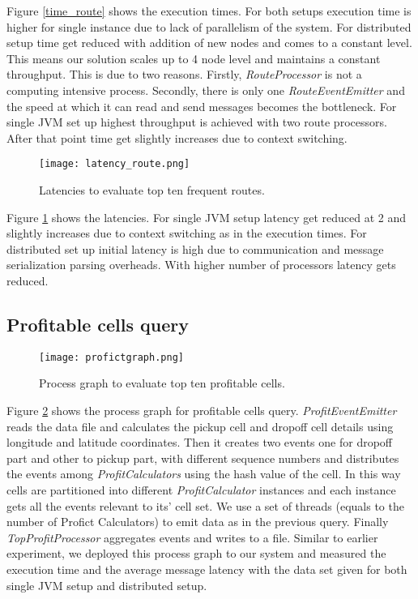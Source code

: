 Figure \ref{time_route} shows the execution times. For both setups execution time is higher for single instance due to lack of parallelism of the system. For distributed setup time get reduced with addition of new nodes and comes to a constant level. This means our solution scales up to 4 node level and maintains a constant throughput. This is due to two reasons. Firstly, \textit{RouteProcessor} is not a computing intensive process. Secondly, there is only one \textit{RouteEventEmitter} and the speed at which it can read and send messages becomes the bottleneck. For single JVM set up highest throughput is achieved with two route processors. After that point time get slightly increases due to context switching.

\begin{figure}[!t]
        \centering
        \texttt{[image: latency\_route.png]}
        \caption{Latencies to evaluate top ten frequent routes.}
        \label{latency_route}
\end{figure}


Figure \ref{latency_route} shows the latencies. For single JVM setup latency get reduced at 2 and slightly increases due to context switching as in the execution times. For distributed set up initial latency is high due to communication and message serialization parsing overheads. With higher number of processors latency gets reduced.

\subsection{Profitable cells query}

\begin{figure}[!t]
        \centering
        \texttt{[image: profictgraph.png]}
        \caption{Process graph to evaluate top ten profitable cells.}
        \label{profictgraph}
\end{figure}

Figure \ref{profictgraph} shows the process graph for profitable cells query. \textit{ProfitEventEmitter} reads the data file and calculates the pickup cell and dropoff cell details using longitude and latitude coordinates. Then it creates two events one for dropoff part and other to pickup part, with different sequence numbers and distributes the events among \textit{ProfitCalculators} using the hash value of the cell. In this way cells are partitioned into different \textit{ProfitCalculator} instances and each instance gets all the events relevant to its' cell set. We use a set of threads (equals to the number of Profict Calculators) to emit data as in the previous query. Finally \textit{TopProfitProcessor} aggregates events and writes to a file. 
Similar to earlier experiment,  we deployed this process graph to our system and measured the execution time and the average message latency with the data set given for both single JVM setup and distributed setup.


